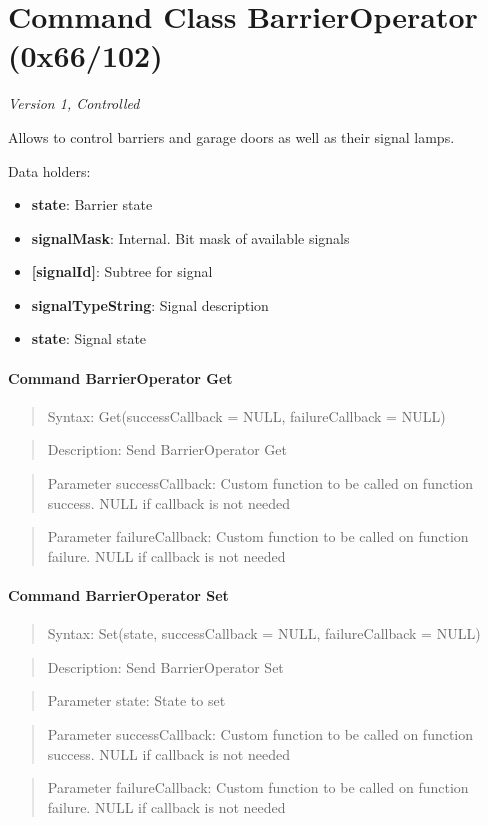 \section{Command Class BarrierOperator (0x66/102)}

\textit{Version 1, Controlled}
\newline

Allows to control barriers and garage doors as well as their signal lamps.
\newline

\noindent
Data holders:

\begin{itemize}
\item \textbf{state}: Barrier state
\item \textbf{signalMask}: Internal. Bit mask of available signals
\item \textbf{[signalId]}: Subtree for signal
\item \qquad\textbf{signalTypeString}: Signal description
\item \qquad\textbf{state}: Signal state
\end{itemize}

\paragraph{Command BarrierOperator Get}
\begin{quote}Syntax: Get(successCallback = NULL, failureCallback = NULL)\end{quote}
\begin{quote}Description: Send BarrierOperator Get\end{quote}
\begin{quote}Parameter successCallback: Custom function to be called on function success. NULL if callback is not needed\end{quote}
\begin{quote}Parameter failureCallback: Custom function to be called on function failure. NULL if callback is not needed\end{quote}


\paragraph{Command BarrierOperator Set}
\begin{quote}Syntax: Set(state, successCallback = NULL, failureCallback = NULL)\end{quote}
\begin{quote}Description: Send BarrierOperator Set\end{quote}
\begin{quote}Parameter state: State to set\end{quote}
\begin{quote}Parameter successCallback: Custom function to be called on function success. NULL if callback is not needed\end{quote}
\begin{quote}Parameter failureCallback: Custom function to be called on function failure. NULL if callback is not needed\end{quote}


